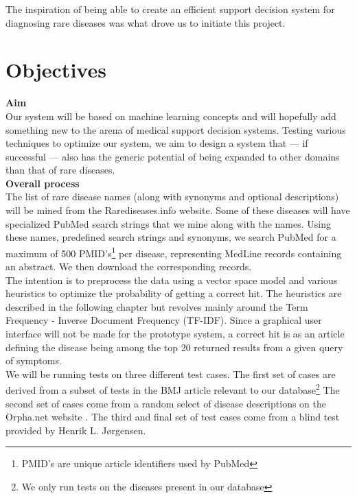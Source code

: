 The inspiration of being able to create an efficient support decision
system for diagnosing rare diseases was what drove us to initiate this
project.

\section{Objectives}

\textbf{Aim} \\
Our system will be based on machine learning concepts and will
hopefully add something new to the arena of medical support decision
systems. Testing various techniques to optimize our system, we aim to
design a system that --- if successful --- also has the generic potential of
being expanded to other domains than that of rare diseases.\\

\textbf{Overall process} \\
The list of rare disease names (along with synonyms and optional
descriptions) will be mined from the Rarediseases.info website. Some
of these diseases will have specialized PubMed search strings that we
mine along with the names. Using these names, predefined search
strings and synonyms, we search PubMed for a maximum of 500
PMID's\footnote{PMID's are unique article identifiers used by PubMed}
per disease, representing MedLine records containing an abstract. We
then download the corresponding records.\\

The intention is to preprocess the data using a vector space model and
various heuristics to optimize the probability of getting a correct
hit. The heuristics are described in the following chapter but
revolves mainly around the Term Frequency - Inverse Document Frequency
(TF-IDF). Since a graphical user interface will not be made for the
prototype system, a correct hit is as an article defining the disease
being among the top 20 returned results from a given query of
symptoms.\\

We will be running tests on three different test cases. The first set
of cases are derived from a subset of tests in the BMJ article
\cite{HangwiTang11102006} relevant to our database\footnote{We only
  run tests on the diseases present in our database} The second set of
cases come from a random select of disease descriptions on the
Orpha.net website \cite{Orphanet}. The third and final set of test
cases come from a blind test provided by Henrik L. J\o rgensen.\\ 

